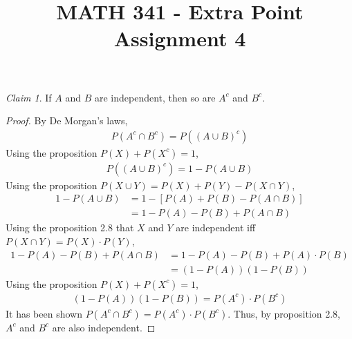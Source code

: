 \documentclass[letterpaper,12pt]{article}
\title{MATH 341 - Extra Point Assignment 4}
\theoremstyle{remark}
\newtheorem*{claim}{Claim}
\begin{document}
\maketitle

\begin{claim}
  If $A$ and $B$ are independent, then so are $A^c$ and $B^c$.
\end{claim}

\begin{proof}
  By De Morgan's laws,
  \begin{align*}
    P(A^c \cap B^c) = P((A \cup B)^c)
  \end{align*}
  Using the proposition $P(X) + P(X^c) = 1$,
  \begin{align*}
    P((A \cup B)^c) = 1 - P(A \cup B)
  \end{align*}
  Using the proposition $P(X \cup Y) = P(X) + P(Y) - P(X \cap Y)$,
  \begin{align*}
    1 - P(A \cup B) &= 1 - [P(A) + P(B) - P(A \cap B)] \\
    &= 1 - P(A) - P(B) + P(A \cap B)
  \end{align*}
  Using the proposition 2.8 that $X$ and $Y$ are independent iff $P(X \cap Y) = P(X) \cdot P(Y)$,
  \begin{align*}
    1 - P(A) - P(B) + P(A \cap B) &= 1 - P(A) - P(B) + P(A) \cdot P(B) \\
    &= (1 - P(A))(1 - P(B))
  \end{align*}
  Using the proposition $P(X) + P(X^c) = 1$,
  \begin{align*}
    (1 - P(A))(1 - P(B)) = P(A^c) \cdot P(B^c)
  \end{align*}
  It has been shown $P(A^c \cap B^c) = P(A^c) \cdot P(B^c)$. Thus, by proposition 2.8, $A^c$ and $B^c$ are also independent.
\end{proof}
\end{document}

